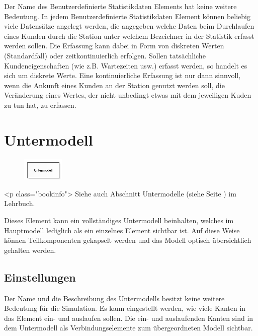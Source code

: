 Der Name des Benutzerdefinierte Statistikdaten Elements hat keine weitere Bedeutung.
In jedem Benutzerdefinierte Statistikdaten Element können beliebig viele Datensätze
angelegt werden, die angegeben welche Daten beim Durchlaufen eines Kunden durch die
Station unter welchem Bezeichner in der Statistik erfasst werden sollen. Die Erfassung
kann dabei in Form von diskreten Werten (Standardfall) oder zeitkontinuierlich
erfolgen. Sollen tatsächliche Kundeneigenschaften (wie z.B. Wartezeiten usw.) erfasst
werden, so handelt es sich um diskrete Werte. Eine kontinuierliche Erfassung ist nur
dann sinnvoll, wenn die Ankunft eines Kunden an der Station genutzt werden soll,
die Veränderung eines Wertes, der nicht unbedingt etwas mit dem jeweiligen Kuden
zu tun hat, zu erfassen.


\section{Untermodell}
\label{ref:ModelElementSub}

\begin{figure}
\vspace{-22pt}
\includegraphics[width=2cm]{imageModelElementSub.png}
\vspace{-22pt}
\end{figure}

<p class="bookinfo">
Siehe auch Abschnitt Untermodelle (siehe Seite \pageref{ref:book:8.12.3}) im Lehrbuch.

Dieses Element kann ein vollständiges Untermodell beinhalten, welches im Hauptmodell
lediglich als ein einzelnes Element sichtbar ist. Auf diese Weise können Teilkomponenten
gekapselt werden und das Modell optisch übersichtlich gehalten werden.

\subsection*{Einstellungen}

Der Name und die Beschreibung des Untermodells besitzt keine weitere Bedeutung für die Simulation.
Es kann eingestellt werden, wie viele Kanten in das Element ein- und auslaufen sollen.
Die ein- und auslaufenden Kanten sind in dem Untermodell als Verbindungselemente zum
übergeordneten Modell sichtbar.





